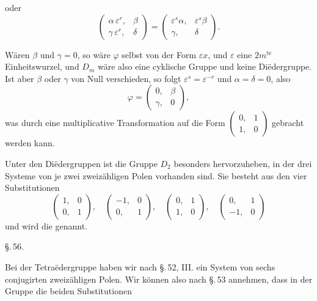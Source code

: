oder
\[
\begin{pmatrix} \alpha\,\varepsilon^r, & \beta \\ \gamma\,\varepsilon^r, & \delta \end{pmatrix} = \begin{pmatrix} \varepsilon^s\alpha, & \varepsilon^s\beta \\ \gamma, & \delta \end{pmatrix}.
\]

Wären $\beta$ und $\gamma = 0$, so wäre $\varphi$ selbst von der Form $\varepsilon x$,
und $\varepsilon$ eine $2m^{\text{te}}$ Einheitswurzel, und $D_m$ wäre also eine cyklische
Gruppe und keine Diëdergruppe. Ist aber $\beta$ oder $\gamma$ von Null
verschieden, so folgt $\varepsilon^s = \varepsilon^{-r}$ und $\alpha = \delta = 0$, also
\[
\varphi = \begin{pmatrix} 0, & \beta \\ \gamma, & 0 \end{pmatrix},
\]
was durch eine multiplicative Transformation auf die Form
$\begin{pmatrix} 0, & 1 \\ 1, & 0 \end{pmatrix}$ gebracht werden kann.

Unter den Diëdergruppen ist die Gruppe $D_2$ besonders
hervorzuheben, in der drei Systeme von je zwei zweizähligen
Polen vorhanden sind. Sie besteht aus den vier Substitutionen
\[
\begin{pmatrix} 1, & 0 \\ 0, & 1 \end{pmatrix},\quad
\begin{pmatrix} -1, & 0 \\ 0, & 1 \end{pmatrix},\quad
\begin{pmatrix} 0, & 1 \\ 1, & 0 \end{pmatrix},\quad
\begin{pmatrix} 0, & 1 \\ -1, & 0 \end{pmatrix}
\]
und wird die  genannt.

\begin{center}
\S.\,56. \\[6pt]
\end{center}

Bei der Tetraëdergruppe haben wir nach \S.\,52, III. ein
System von sechs conjugirten zweizähligen Polen. Wir können
also nach \S.\,53 annehmen, dass in der Gruppe die beiden Substitutionen


